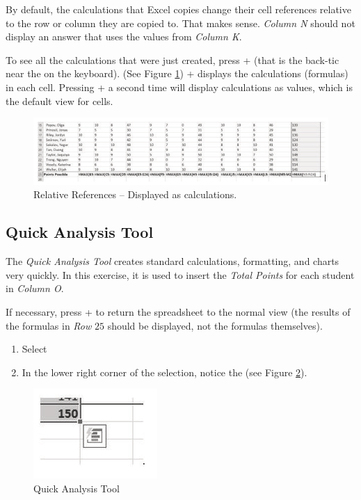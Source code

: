 By default, the calculations that Excel copies change their cell references relative to the row or column they are copied to. That makes sense. \textit{Column N} should not display an answer that uses the values from \textit{Column K}.

To see all the calculations that were just created, press  +  (that is the back-tic near the  on the keyboard). (See Figure \ref{03:fig03})  +  displays the calculations (formulas) in each cell. Pressing  +  a second time will display calculations as values, which is the default view for cells.

\begin{figure}[H]
	\centering
	\includegraphics[width=\maxwidth{.95\linewidth}]{gfx/ch03_fig03}
	\caption{Relative References – Displayed as calculations.}
	\label{03:fig03}
\end{figure}

\subsection{Quick Analysis Tool}

The \textit{Quick Analysis Tool} creates standard calculations, formatting, and charts very quickly. In this exercise, it is used to insert the \textit{Total Points} for each student in \textit{Column O}.

If necessary, press  +  to return the spreadsheet to the normal view (the results of the formulas in \textit{Row }$ 25 $ should be displayed, not the formulas themselves).

\begin{enumerate}
	\item Select 
	\item In the lower right corner of the selection, notice the  (see Figure \ref{03:fig04}).
\end{enumerate}

\begin{figure}[H]
	\centering
	\includegraphics[width=\maxwidth{.95\linewidth}]{gfx/ch03_fig04}
	\caption{Quick Analysis Tool}
	\label{03:fig04}
\end{figure}

